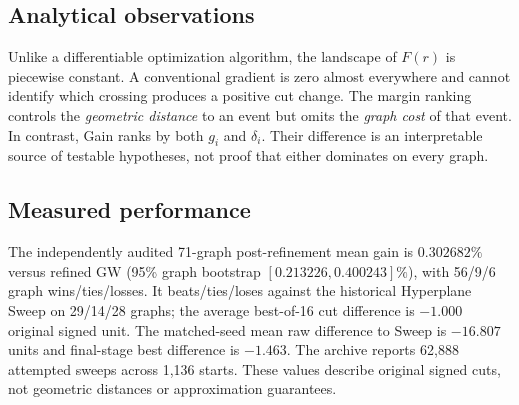 \subsection{Analytical observations}
Unlike a differentiable optimization algorithm, the landscape of $F(r)$ is piecewise constant. A conventional gradient is zero almost everywhere and cannot identify which crossing produces a positive cut change. The margin ranking controls the \emph{geometric distance} to an event but omits the \emph{graph cost} of that event. In contrast, Gain ranks by both $g_i$ and $\delta_i$. Their difference is an interpretable source of testable hypotheses, not proof that either dominates on every graph.

\subsection{Measured performance}
The independently audited 71-graph post-refinement mean gain is $0.302682\%$ versus refined GW (95\% graph bootstrap $[0.213226,0.400243]\%$), with 56/9/6 graph wins/ties/losses. It beats/ties/loses against the historical Hyperplane Sweep on 29/14/28 graphs; the average best-of-16 cut difference is $-1.000$ original signed unit. The matched-seed mean raw difference to Sweep is $-16.807$ units and final-stage best difference is $-1.463$. The archive reports 62,888 attempted sweeps across 1,136 starts. These values describe original signed cuts, not geometric distances or approximation guarantees.
